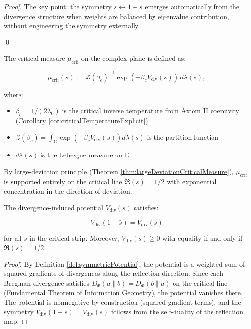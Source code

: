\begin{theorem}
\begin{lemma}
\begin{proof}
The key point: the symmetry $s \leftrightarrow 1-\bar{s}$ emerges automatically from the divergence structure when weights are balanced by eigenvalue contribution, without engineering the symmetry externally.

\qed

\end{proof}

\end{lemma}

\begin{definition}
\label{def:criticalMeasure}

The critical measure $\mu_{\mathrm{crit}}$ on the complex plane is defined as:

\[\mu_{\mathrm{crit}}(s) := \mathcal{Z}(\beta_c)^{-1} \exp(-\beta_c V_{\mathrm{div}}(s)) \, d\lambda(s),\]

where:
\begin{itemize}
\item $\beta_c = 1/(2\lambda_0)$ is the critical inverse temperature from Axiom II
  coercivity (Corollary \ref{cor:criticalTemperatureExplicit})
\item $\mathcal{Z}(\beta_c) = \int_{\mathbb{C}} \exp(-\beta_c V_{\mathrm{div}}(s)) d\lambda(s)$
  is the partition function
\item $d\lambda(s)$ is the Lebesgue measure on $\mathbb{C}$
\end{itemize}

By large-deviation principle (Theorem \ref{thm:largeDeviationCriticalMeasure}),
$\mu_{\mathrm{crit}}$ is supported entirely on the critical line $\Re(s) = 1/2$
with exponential concentration in the direction of deviation.

\end{definition}

\begin{lemma}
\label{lem:reflectionSymmetryPotential}

The divergence-induced potential $V_{\mathrm{div}}(s)$ satisfies:

\[V_{\mathrm{div}}(1 - \bar{s}) = V_{\mathrm{div}}(s)\]

for all $s$ in the critical strip. Moreover, $V_{\mathrm{div}}(s) \geq 0$ with
equality if and only if $\Re(s) = 1/2$.

\begin{proof}
By Definition \ref{def:symmetricPotential}, the potential is a weighted sum
of squared gradients of divergences along the reflection direction. Since each
Bregman divergence satisfies $D_\Phi(a \| b) = D_\Phi(b \| a)$ on the critical
line (Fundamental Theorem of Information Geometry), the potential vanishes there.
The potential is nonnegative by construction (squared gradient terms), and the
symmetry $V_{\mathrm{div}}(1 - \bar{s}) = V_{\mathrm{div}}(s)$ follows from the
self-duality of the reflection map.
\end{proof}


\end{lemma}
\end{theorem}
